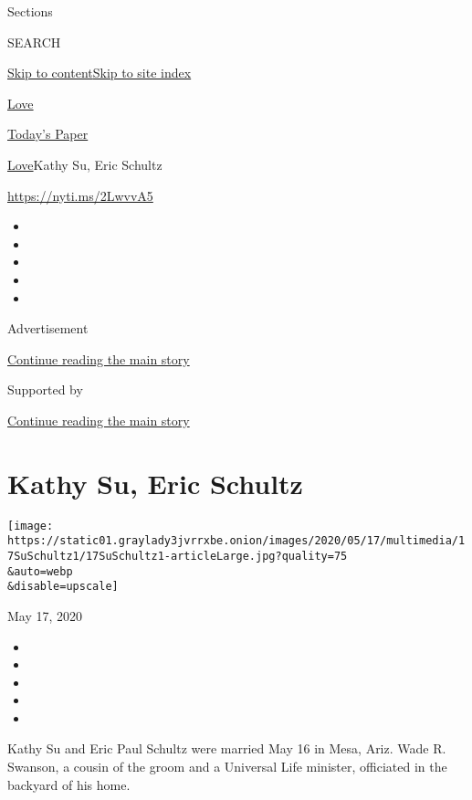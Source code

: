 Sections

SEARCH

\protect\hyperlink{site-content}{Skip to
content}\protect\hyperlink{site-index}{Skip to site index}

\href{https://www.nytimes3xbfgragh.onion/section/fashion/weddings}{Love}

\href{https://myaccount.nytimes3xbfgragh.onion/auth/login?response_type=cookie\&client_id=vi}{}

\href{https://www.nytimes3xbfgragh.onion/section/todayspaper}{Today's
Paper}

\href{/section/fashion/weddings}{Love}\textbar{}Kathy Su, Eric Schultz

\url{https://nyti.ms/2LwvvA5}

\begin{itemize}
\item
\item
\item
\item
\item
\end{itemize}

Advertisement

\protect\hyperlink{after-top}{Continue reading the main story}

Supported by

\protect\hyperlink{after-sponsor}{Continue reading the main story}

\hypertarget{kathy-su-eric-schultz}{%
\section{Kathy Su, Eric Schultz}\label{kathy-su-eric-schultz}}

\texttt{[image: https://static01.graylady3jvrrxbe.onion/images/2020/05/17/multimedia/17SuSchultz1/17SuSchultz1-articleLarge.jpg?quality=75\\\&auto=webp\\\&disable=upscale]}

May 17, 2020

\begin{itemize}
\item
\item
\item
\item
\item
\end{itemize}

Kathy Su and Eric Paul Schultz were married May 16 in Mesa, Ariz. Wade
R. Swanson, a cousin of the groom and a Universal Life minister,
officiated in the backyard of his home.

